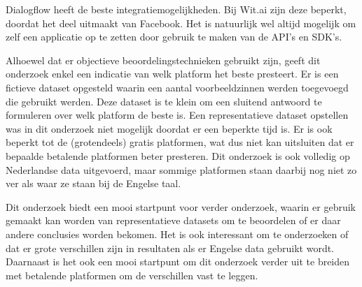 Dialogflow heeft de beste integratiemogelijkheden. Bij Wit.ai zijn deze beperkt, doordat het deel uitmaakt van Facebook. Het is natuurlijk wel altijd mogelijk om zelf een applicatie op te zetten door gebruik te maken van de API’s en SDK’s.

Alhoewel dat er objectieve beoordelingstechnieken gebruikt zijn, geeft dit onderzoek enkel een indicatie van welk platform het beste presteert. Er is een fictieve dataset opgesteld waarin een aantal voorbeeldzinnen werden toegevoegd die gebruikt werden. Deze dataset is te klein om een sluitend antwoord te formuleren over welk platform de beste is. Een representatieve dataset opstellen was in dit onderzoek niet mogelijk doordat er een beperkte tijd is. Er is ook beperkt tot de (grotendeels) gratis platformen, wat dus niet kan uitsluiten dat er bepaalde betalende platformen beter presteren. Dit onderzoek is ook volledig op Nederlandse data uitgevoerd, maar sommige platformen staan daarbij nog niet zo ver als waar ze staan bij de Engelse taal.

Dit onderzoek biedt een mooi startpunt voor verder onderzoek, waarin er gebruik gemaakt kan worden van representatieve datasets om te beoordelen of er daar andere conclusies worden bekomen. Het is ook interessant om te onderzoeken of dat er grote verschillen zijn in resultaten als er Engelse data gebruikt wordt. Daarnaast is het ook een mooi startpunt om dit onderzoek verder uit te breiden met betalende platformen om de verschillen vast te leggen.


